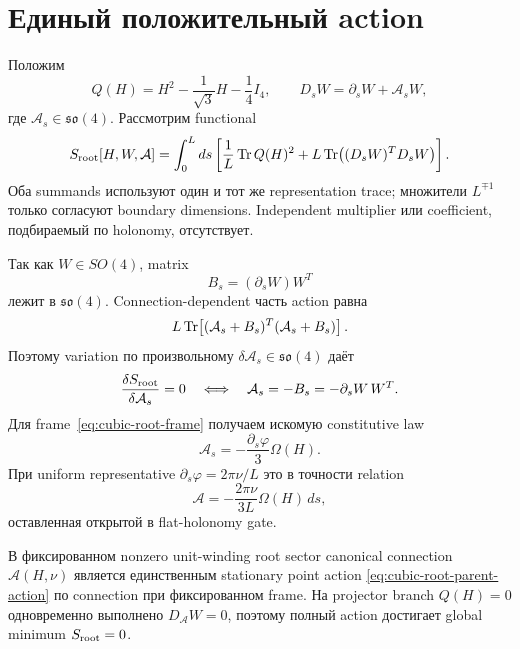 \section{Единый положительный action}

Положим
\begin{equation}
 Q(H)=H^2-\frac1{\sqrt3}H-\frac14I_4,
 \qquad
 D_sW=\partial_sW+\mathcal A_sW,
\end{equation}
где \(\mathcal A_s\in\mathfrak{so}(4)\). Рассмотрим functional
\begin{equation}
 S_{\rm root}[H,W,\mathcal A]
 =\int_0^L ds\left[
  \frac1L\operatorname{Tr} Q(H)^2
  +L\operatorname{Tr}\!\left((D_sW)^T D_sW\right)
 \right].
 \label{eq:cubic-root-parent-action}
\end{equation}
Оба summands используют один и тот же representation trace; множители
\(L^{\mp1}\) только согласуют boundary dimensions. Independent multiplier
или coefficient, подбираемый по holonomy, отсутствует.

Так как \(W\in SO(4)\), matrix
\begin{equation}
 B_s=(\partial_sW)W^T
\end{equation}
лежит в \(\mathfrak{so}(4)\). Connection-dependent часть action равна
\begin{equation}
 L\operatorname{Tr}\!\left[(\mathcal A_s+B_s)^T(\mathcal A_s+B_s)\right].
\end{equation}
Поэтому variation по произвольному
\(\delta\mathcal A_s\in\mathfrak{so}(4)\) даёт
\begin{equation}
 \frac{\delta S_{\rm root}}{\delta\mathcal A_s}=0
 \quad\Longleftrightarrow\quad
 \mathcal A_s=-B_s=-\partial_sW\,W^T.
 \label{eq:connection-euler-lagrange}
\end{equation}
Для frame~\eqref{eq:cubic-root-frame} получаем искомую constitutive law
\begin{equation}
 \boxed{
 \mathcal A_s
 =-\frac{\partial_s\varphi}{3}\Omega(H)}.
 \label{eq:derived-projector-connection}
\end{equation}
При uniform representative
\(\partial_s\varphi=2\pi\nu/L\) это в точности relation
\begin{equation}
 \mathcal A
 =-\frac{2\pi\nu}{3L}\Omega(H)\,ds,
\end{equation}
оставленная открытой в flat-holonomy gate.

\begin{theorem}
В фиксированном nonzero unit-winding root sector canonical connection
\(\mathcal A(H,\nu)\) является единственным stationary point action
\eqref{eq:cubic-root-parent-action} по connection при фиксированном frame.
На projector branch \(Q(H)=0\) одновременно выполнено \(D_{\mathcal A}W=0\),
поэтому полный action достигает global minimum \(S_{\rm root}=0\).
\end{theorem}

